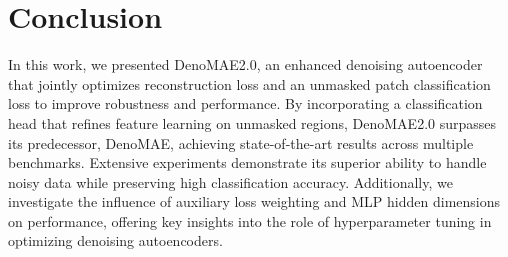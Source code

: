 \section{Conclusion}

In this work, we presented DenoMAE2.0, an enhanced denoising autoencoder that jointly optimizes reconstruction loss and an unmasked patch classification loss to improve robustness and performance. By incorporating a classification head that refines feature learning on unmasked regions, DenoMAE2.0 surpasses its predecessor, DenoMAE, achieving state-of-the-art results across multiple benchmarks. Extensive experiments demonstrate its superior ability to handle noisy data while preserving high classification accuracy. Additionally, we investigate the influence of auxiliary loss weighting and MLP hidden dimensions on performance, offering key insights into the role of hyperparameter tuning in optimizing denoising autoencoders.
